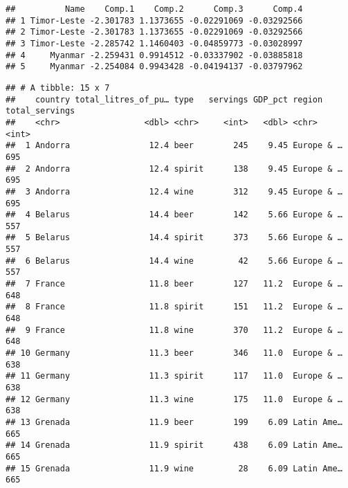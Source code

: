 \documentclass[]{article}
\newenvironment{Shaded}{\begin{snugshade}}{\end{snugshade}}
\newcommand{\KeywordTok}[1]{\textcolor[rgb]{0.13,0.29,0.53}{\textbf{#1}}}
\newcommand{\StringTok}[1]{\textcolor[rgb]{0.31,0.60,0.02}{#1}}
\newcommand{\OperatorTok}[1]{\textcolor[rgb]{0.81,0.36,0.00}{\textbf{#1}}}
\newcommand{\NormalTok}[1]{#1}
\begin{document}
\begin{verbatim}
##          Name    Comp.1    Comp.2      Comp.3      Comp.4
## 1 Timor-Leste -2.301783 1.1373655 -0.02291069 -0.03292566
## 2 Timor-Leste -2.301783 1.1373655 -0.02291069 -0.03292566
## 3 Timor-Leste -2.285742 1.1460403 -0.04859773 -0.03028997
## 4     Myanmar -2.259431 0.9914512 -0.03337902 -0.03885818
## 5     Myanmar -2.254084 0.9943428 -0.04194137 -0.03797962
\end{verbatim}

\begin{Shaded}
\end{Shaded}

\begin{verbatim}
## # A tibble: 15 x 7
##    country total_litres_of_pu… type   servings GDP_pct region     total_servings
##    <chr>                 <dbl> <chr>     <int>   <dbl> <chr>               <int>
##  1 Andorra                12.4 beer        245    9.45 Europe & …            695
##  2 Andorra                12.4 spirit      138    9.45 Europe & …            695
##  3 Andorra                12.4 wine        312    9.45 Europe & …            695
##  4 Belarus                14.4 beer        142    5.66 Europe & …            557
##  5 Belarus                14.4 spirit      373    5.66 Europe & …            557
##  6 Belarus                14.4 wine         42    5.66 Europe & …            557
##  7 France                 11.8 beer        127   11.2  Europe & …            648
##  8 France                 11.8 spirit      151   11.2  Europe & …            648
##  9 France                 11.8 wine        370   11.2  Europe & …            648
## 10 Germany                11.3 beer        346   11.0  Europe & …            638
## 11 Germany                11.3 spirit      117   11.0  Europe & …            638
## 12 Germany                11.3 wine        175   11.0  Europe & …            638
## 13 Grenada                11.9 beer        199    6.09 Latin Ame…            665
## 14 Grenada                11.9 spirit      438    6.09 Latin Ame…            665
## 15 Grenada                11.9 wine         28    6.09 Latin Ame…            665
\end{verbatim}
\end{document}
